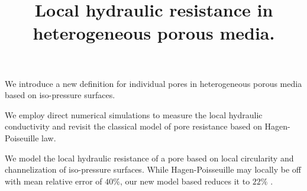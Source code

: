 \documentclass[draft]{agujournal2019}
\begin{document}
\title{Local hydraulic resistance in heterogeneous porous media.}











\begin{keypoints}
\item We introduce a new definition for individual pores in heterogeneous porous media based on iso-pressure surfaces.
\item We employ direct numerical simulations to measure the local hydraulic conductivity and revisit the classical model of pore resistance based on Hagen-Poiseuille law. 
\item We model the local hydraulic resistance of a pore based on local circularity and channelization of iso-pressure surfaces. While Hagen-Poisseuille may locally be off with mean relative error of $40\%$, our new model based reduces it to $22\%$ .
\end{keypoints}
\end{document}
